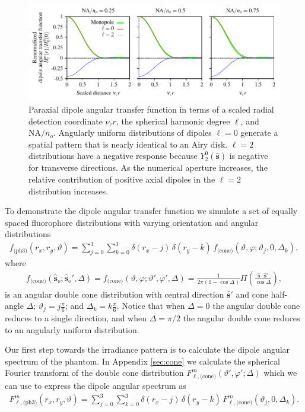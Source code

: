 \documentclass[]{osa-article}
\providecommand{\so}{\mathbf{\hat{s}}_o}
\providecommand{\mh}[1]{\mathbf{\hat{#1}}}
\begin{document}
\begin{figure}[h]
 \centering
   \centering
   \includegraphics[scale=0.8]{../figures/paratfs/adtf.pdf}
   \caption{Paraxial dipole angular transfer function in terms of a scaled
     radial detection coordinate $\nu_c r$, the spherical harmonic degree
     $\ell$, and $\text{NA}/n_o$. Angularly uniform distributions of dipoles
     $\ell=0$ generate a spatial pattern that is nearly identical to an Airy
     disk. $\ell=2$ distributions have a negative response because
     $Y_2^0(\mh{s})$ is negative for transverse directions. As the numerical
     aperture increases, the relative contribution of positive axial dipoles in
     the $\ell=2$ distribution increases.}
   \label{fig:atf}
 \end{figure}

 To demonstrate the dipole angular transfer function we simulate a set of
 equally spaced fluorophore distributions with varying orientation and angular
 distributions
 \begin{align}
   f_{\text{(ph3)}}(r_x, r_y, \vartheta) = \sum_{j=0}^3 \sum_{k=0}^3 \delta\left(r_x - j\right)\, \delta\left(r_y - k\right)\, f_{\text{(cone)}}\left(\vartheta, \varphi; \vartheta_j, 0, \Delta_k\right),\label{eq:phantom3}
 \end{align}
 where
 \begin{align}
   f_{\text{(cone)}}(\so; \so', \Delta) = f_{\text{(cone)}}(\vartheta, \varphi; \vartheta', \varphi', \Delta) = \frac{1}{2\pi(1 - \cos\Delta)}\Pi\left(\frac{\mh{s}\cdot\mh{s}'}{\cos\Delta}\right),
 \end{align}
 is an angular double cone distribution with central direction $\mh{s}'$ and
 cone half-angle $\Delta$; $\vartheta_j = j\frac{\pi}{6}$; and
 $\Delta_k = k\frac{\pi}{6}$. Notice that when $\Delta = 0$ the angular double
 cone reduces to a single direction, and when $\Delta = \pi/2$ the angular
 double cone reduces to an angularly uniform distribution.
 
 Our first step towards the irradiance pattern is to calculate the dipole
 angular spectrum of the phantom. In Appendix \ref{sec:cone} we calculate the
 spherical Fourier transform of the double cone distribution
 $F^m_{\ell,\text{(cone)}}(\vartheta', \varphi'; \Delta)$ which we can use to
 express the dipole angular spectrum as
 \begin{align}
   F^{m}_{\ell,\text{(ph3)}}(r_x, r_y, \vartheta) = \sum_{j=0}^3 \sum_{k=0}^3 \delta\left(r_x - j\right)\, \delta\left(r_y - k\right)\, F^m_{\ell,\text{(cone)}}\left(\vartheta_j, 0, \Delta_k\right).\label{eq:phantom3spect}
 \end{align}
\end{document}

